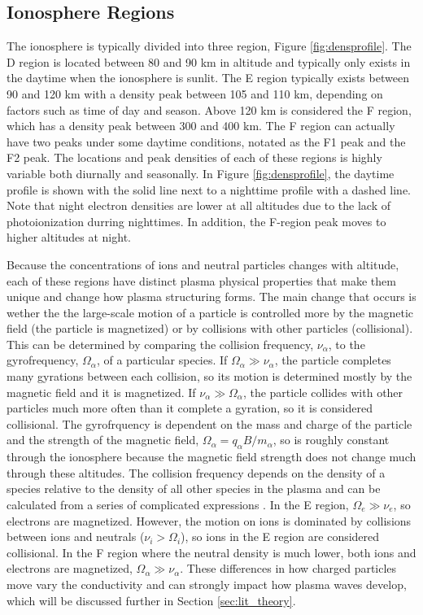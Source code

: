 \subsection{Ionosphere Regions}
\label{sec:ionosphere_regions}
The ionosphere is typically divided into three region, Figure \ref{fig:densprofile}.  The D region is located between 80 and 90 km in altitude and typically only exists in the daytime when the ionosphere is sunlit.  The E region typically exists between 90 and 120 km with a density peak between 105 and 110 km, depending on factors such as time of day and season.  Above 120 km is considered the F region, which has a density peak between 300 and 400 km.  The F region can actually have two peaks under some daytime conditions, notated as the F1 peak and the F2 peak.  The locations and peak densities of each of these regions is highly variable both diurnally and seasonally.  In Figure \ref{fig:densprofile}, the daytime profile is shown with the solid line next to a nighttime profile with a dashed line.  Note that night electron densities are lower at all altitudes due to the lack of photoionization durring nighttimes.  In addition, the F-region peak moves to higher altitudes at night.

Because the concentrations of ions and neutral particles changes with altitude, each of these regions have distinct plasma physical properties that make them unique and change how plasma structuring forms.  The main change that occurs is wether the the large-scale motion of a particle is controlled more by the magnetic field (the particle is magnetized) or by collisions with other particles (collisional).  This can be determined by comparing the collision frequency, \(\nu_\alpha\), to the gyrofrequency, \(\Omega_\alpha\), of a particular species.  If \(\Omega_\alpha \gg \nu_\alpha\), the particle completes many gyrations between each collision, so its motion is determined mostly by the magnetic field and it is magnetized.  If \(\nu_\alpha \gg \Omega_\alpha\), the particle collides with other particles much more often than it complete a gyration, so it is considered collisional.  The gyrofrquency is dependent on the mass and charge of the particle and the strength of the magnetic field, \(\Omega_\alpha = q_\alpha B/m_\alpha\), so is roughly constant through the ionosphere because the magnetic field strength does not change much through these altitudes.  The collision frequency depends on the density of a species relative to the density of all other species in the plasma and can be calculated from a series of complicated expressions \citep{Schunk1980,Schunk2009}.  In the E region, \(\Omega_e \gg \nu_e\), so electrons are magnetized.  However, the motion on ions is dominated by collisions between ions and neutrals (\(\nu_i > \Omega_i\)), so ions in the E region are considered collisional.  In the F region where the neutral density is much lower, both ions and electrons are magnetized, \(\Omega_\alpha \gg \nu_\alpha\).  These differences in how charged particles move vary the conductivity and can strongly impact how plasma waves develop, which will be discussed further in Section \ref{sec:lit_theory}.

